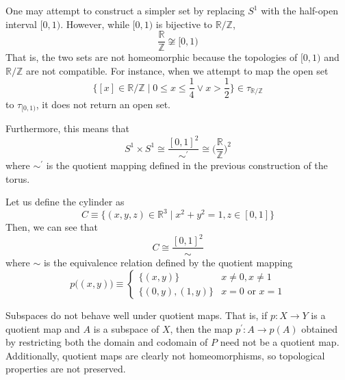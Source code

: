 \begin{example}
      One may attempt to construct a simpler set by replacing $S^1$ with the half-open interval $[0,1)$. However, while $[0,1)$ is bijective to $\mathbb{R} / \mathbb{Z}$,
      \begin{equation}
        \frac{\mathbb{R}}{\mathbb{Z}} \not\cong [0,1)
      \end{equation}
      That is, the two sets are not homeomorphic because the topologies of $[0,1)$ and $\mathbb{R} / \mathbb{Z}$ are not compatible. For instance, when we attempt to map the open set 
      \begin{equation}
        \bigg\{ [x] \in \mathbb{R} / \mathbb{Z} \; | \; 0 \leq x \leq \frac{1}{4} \vee x > \frac{1}{2} \bigg\} \in \tau_{\mathbb{R} / \mathbb{Z}}
      \end{equation}
      to $\tau_{[0,1)}$, it does not return an open set. 

      Furthermore, this means that
      \begin{equation}
        S^1 \times S^1 \cong \frac{[0,1]^2}{\sim^\prime} \cong \bigg( \frac{\mathbb{R}}{\mathbb{Z}} \bigg)^2
      \end{equation}
      where $\sim^\prime$ is the quotient mapping defined in the previous construction of the torus. 
    \end{example}

    \begin{example}
      Let us define the cylinder as 
      \begin{equation}
        C \equiv \{(x, y, z) \in \mathbb{R}^3 \; | \; x^2 + y^2 = 1, z \in [0,1]\} 
      \end{equation}
      Then, we can see that
      \begin{equation}
        C \cong \frac{[0,1]^2}{\sim}
      \end{equation}
      where $\sim$ is the equivalence relation defined by the quotient mapping 
      \begin{equation}
        p\big((x, y)\big) \equiv \begin{cases} \{(x, y)\} & x \neq 0, x \neq 1 \\ \{(0,y), (1, y)\} & x = 0 \text{ or } x = 1 \end{cases}
      \end{equation}
    \end{example}

    Subspaces do not behave well under quotient maps. That is, if $p: X \rightarrow Y$ is a quotient map and $A$ is a subspace of $X$, then the map $p^\prime: A \rightarrow p(A)$ obtained by restricting both the domain and codomain of $P$ need not be a quotient map. Additionally, quotient maps are clearly not homeomorphisms, so topological properties are not preserved. 

